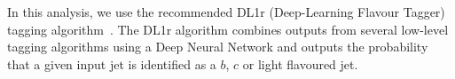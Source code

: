 In this analysis, we use the recommended DL1r (Deep-Learning Flavour Tagger) tagging algorithm~\cite{DL1r-slides}. The DL1r algorithm combines outputs from several low-level tagging algorithms using a Deep Neural Network and outputs the probability that a given input jet is identified as a $b$, $c$ or light flavoured jet.